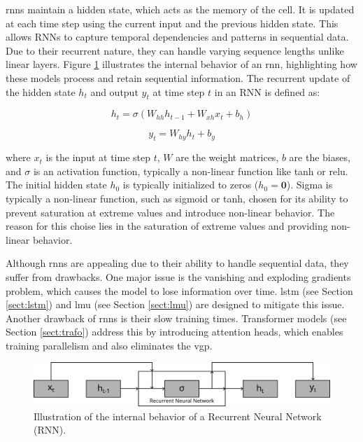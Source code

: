 \glspl{rnn} maintain a hidden state, which acts as the memory of the cell. It is updated at each time step using the current input and the previous hidden state. This allows RNNs to capture temporal dependencies and patterns in sequential data. Due to their recurrent nature, they can handle varying sequence lengths unlike linear layers. Figure \ref{fig:rnn} illustrates the internal behavior of an \gls{rnn}, highlighting how these models process and retain sequential information. The recurrent update of the hidden state \( h_t \) and output \( y_t \) at time step \( t \) in an RNN is defined as:

\begin{equation}
    h_t = \sigma(W_{hh} h_{t-1} + W_{xh} x_t + b_h) 
\end{equation}

\begin{equation}
    y_t = W_{hy} h_t + b_y 
\end{equation}

where \( x_t \) is the input at time step \( t \), \( W \) are the weight matrices, \( b \) are the biases, and \( \sigma \) is an activation function, typically a non-linear function like \gls{tanh} or \gls{relu}. The initial hidden state \( h_0 \) is typically initialized to zeros (\( h_0 = \mathbf{0} \)). Sigma is typically a non-linear function, such as sigmoid or \gls{tanh}, chosen for its ability to prevent saturation at extreme values and introduce non-linear behavior. The reason for this choise lies in the saturation of extreme values and providing non-linear behavior. 

Although \glspl{rnn} are appealing due to their ability to handle sequential data, they suffer from drawbacks. One major issue is the vanishing and exploding gradients problem, which causes the model to lose information over time. \gls{lstm} (see Section \ref{sect:lstm}) and \gls{lmu} (see Section \ref{sect:lmu}) are designed to mitigate this issue. Another drawback of \glspl{rnn} is their slow training times. Transformer models (see Section \ref{sect:trafo}) address this by introducing attention heads, which enables training parallelism and also eliminates the \gls{vgp}.

\begin{figure}[t]
    \centering
    \includegraphics[width=\textwidth]{contents/Basics/rnn_flat.png}
    \caption{Illustration of the internal behavior of a Recurrent Neural Network (RNN).}
    \label{fig:rnn}
\end{figure}

